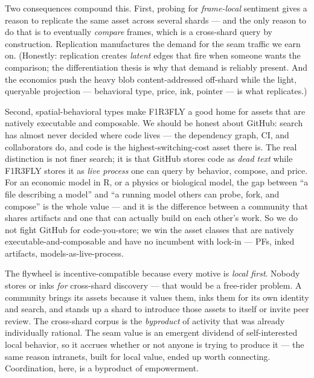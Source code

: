 \documentclass[11pt]{article}
\begin{document}
Two consequences compound this. First, probing for \emph{frame-local} sentiment gives a reason to replicate the same asset across several shards --- and the only reason to do that is to eventually \emph{compare} frames, which is a cross-shard query by construction. Replication manufactures the demand for the seam traffic we earn on. (Honestly: replication creates \emph{latent} edges that fire when someone wants the comparison; the differentiation thesis is why that demand is reliably present. And the economics push the heavy blob content-addressed off-shard while the light, queryable projection --- behavioral type, price, ink, pointer --- is what replicates.)

Second, spatial-behavioral types make F1R3FLY a good home for assets that are natively executable and composable. We should be honest about GitHub: search has almost never decided where code lives --- the dependency graph, CI, and collaborators do, and code is the highest-switching-cost asset there is. The real distinction is not finer search; it is that GitHub stores code as \emph{dead text} while F1R3FLY stores it as \emph{live process} one can query by behavior, compose, and price. For an economic model in R, or a physics or biological model, the gap between ``a file describing a model'' and ``a running model others can probe, fork, and compose'' is the whole value --- and it is the difference between a community that shares artifacts and one that can actually build on each other's work. So we do not fight GitHub for code-you-store; we win the asset classes that are natively executable-and-composable and have no incumbent with lock-in --- PFs, inked artifacts, models-as-live-process.

\begin{keybox}
The flywheel is incentive-compatible because every motive is \emph{local first}. Nobody stores or inks \emph{for} cross-shard discovery --- that would be a free-rider problem. A community brings its assets because it values them, inks them for its own identity and search, and stands up a shard to introduce those assets to itself or invite peer review. The cross-shard corpus is the \emph{byproduct} of activity that was already individually rational. The seam value is an emergent dividend of self-interested local behavior, so it accrues whether or not anyone is trying to produce it --- the same reason intranets, built for local value, ended up worth connecting. Coordination, here, is a byproduct of empowerment.
\end{keybox}
\end{document}
